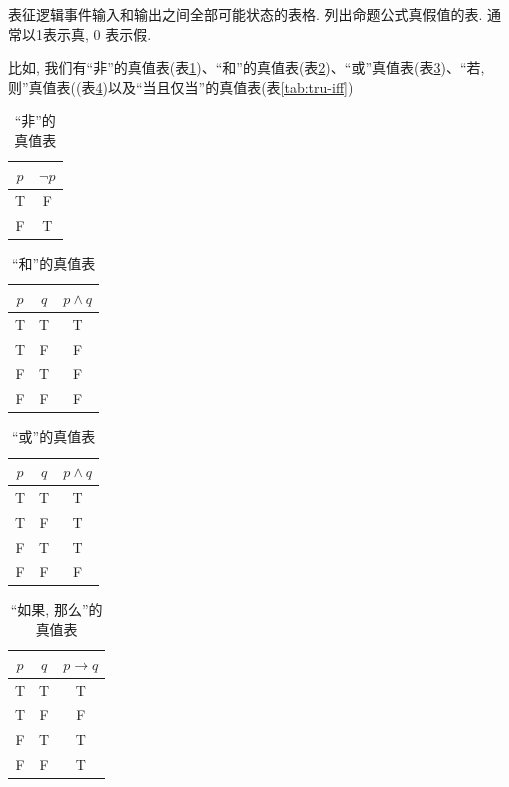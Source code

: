 \begin{definition}[真值表]
	表征逻辑事件输入和输出之间全部可能状态的表格. 列出命题公式真假值的表. 通常以1表示真, 0 表示假. 
\end{definition}

比如, 我们有``非''的真值表(表\ref{tab:tru-not})、``和''的真值表(表\ref{tab:tru-and})、``或''真值表(表\ref{tab:tru-or})、``若,则''真值表((表\ref{tab:tru-if-then})以及``当且仅当''的真值表(表\ref{tab:tru-iff})

\begin{table}
	\centering
	\begin{tabular}{|c|c|}
		\hline
		$p$ & $\lnot p$ \\ 
		\hline
		T & F\\ 
		F & T\\
		\hline
	\end{tabular}
	\caption{``非''的真值表}
	\label{tab:tru-not}
\end{table}

\begin{table}
	\centering
	\begin{tabular}{|c|c|c|}
		\hline
		$p$ & $q$ & $p\land q$ \\ 
		\hline
		T & T & T\\ 
		T & F & F\\
		F & T & F\\ 
		F & F & F\\
		\hline
	\end{tabular}
	\caption{``和''的真值表}
	\label{tab:tru-and}
\end{table}

\begin{table}
	\centering
	\begin{tabular}{|c|c|c|}
		\hline
		$p$ & $q$ & $p\land q$ \\ 
		\hline
		T & T & T\\ 
		T & F & T\\
		F & T & T\\ 
		F & F & F\\
		\hline
	\end{tabular}
	\caption{``或''的真值表}
	\label{tab:tru-or}
\end{table}

\begin{table}
	\centering
	\begin{tabular}{|c|c|c|}
		\hline
		$p$ & $q$ & $p\to  q$ \\ 
		\hline
		T & T & T\\ 
		T & F & F\\
		F & T & T\\ 
		F & F & T\\
		\hline
	\end{tabular}
	\caption{``如果, 那么''的真值表}
	\label{tab:tru-if-then}
\end{table}

